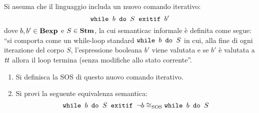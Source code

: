 \newcommand{\exitifSOS}{\SOSRule{exitif}{}{SOS}}
{Si assuma che il linguaggio \while{} includa un nuovo comando iterativo:
$$
\wbSE{b}{S}{b'}
$$
dove $b, b' \in \bexp$ e $S \in \stm$, la cui semanticac informale è definita
come segue:
``si comporta come un while-loop standard $\wbS{b}{S}$ in cui, alla fine di
ogni iterazione del corpo $S$, l'espressione booleana $b'$ viene valutata e se
$b'$ è valutata a $\semtrue$ allora il loop termina (senza modifiche allo
stato corrente''.
\begin{enumerate}[label=$\arabic*$.]
	\item Si definisca la SOS di questo nuovo comando iterativo.
	\item Si provi la seguente equivalenza semantica:
	$$
	\wbSE{b}{S}{\neg b} \eqSOS \wbS{b}{S}
	$$
\end{enumerate}
}
{}
